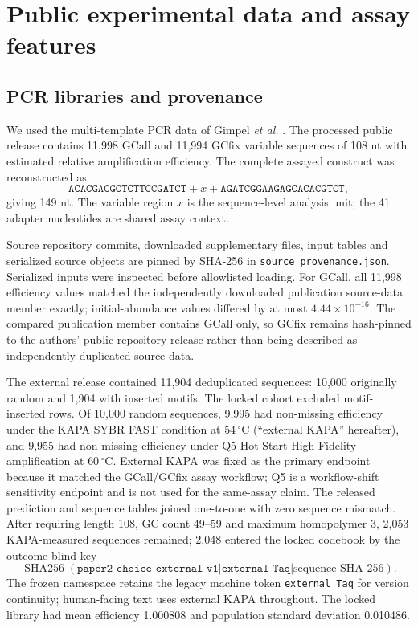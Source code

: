 \documentclass[10pt]{article}
\begin{document}
\section{Public experimental data and assay features}

\subsection{PCR libraries and provenance}

We used the multi-template PCR data of Gimpel \emph{et al.} \cite{gimpel2025pcrbias}. The processed public release contains 11,998 GCall and 11,994 GCfix variable sequences of 108 nt with estimated relative amplification efficiency. The complete assayed construct was reconstructed as
\[
 \texttt{ACACGACGCTCTTCCGATCT}+x+
 \texttt{AGATCGGAAGAGCACACGTCT},
\]
giving 149 nt. The variable region $x$ is the sequence-level analysis unit; the 41 adapter nucleotides are shared assay context.

Source repository commits, downloaded supplementary files, input tables and serialized source objects are pinned by SHA-256 in \texttt{source\_provenance.json}. Serialized inputs were inspected before allowlisted loading. For GCall, all 11,998 efficiency values matched the independently downloaded publication source-data member exactly; initial-abundance values differed by at most $4.44\times10^{-16}$. The compared publication member contains GCall only, so GCfix remains hash-pinned to the authors' public repository release rather than being described as independently duplicated source data.

The external release contained 11,904 deduplicated sequences: 10,000 originally random and 1,904 with inserted motifs. The locked cohort excluded motif-inserted rows. Of 10,000 random sequences, 9,995 had non-missing efficiency under the KAPA SYBR FAST condition at $54\,^{\circ}$C (``external KAPA'' hereafter), and 9,955 had non-missing efficiency under Q5 Hot Start High-Fidelity amplification at $60\,^{\circ}$C. External KAPA was fixed as the primary endpoint because it matched the GCall/GCfix assay workflow; Q5 is a workflow-shift sensitivity endpoint and is not used for the same-assay claim. The released prediction and sequence tables joined one-to-one with zero sequence mismatch. After requiring length 108, GC count 49--59 and maximum homopolymer 3, 2,053 KAPA-measured sequences remained; 2,048 entered the locked codebook by the outcome-blind key
\[
\operatorname{SHA256}(\texttt{paper2-choice-external-v1}|\texttt{external\_Taq}|\text{sequence SHA-256}).
\]
The frozen namespace retains the legacy machine token \texttt{external\_Taq} for version continuity; human-facing text uses external KAPA throughout. The locked library had mean efficiency 1.000808 and population standard deviation 0.010486.
\end{document}
